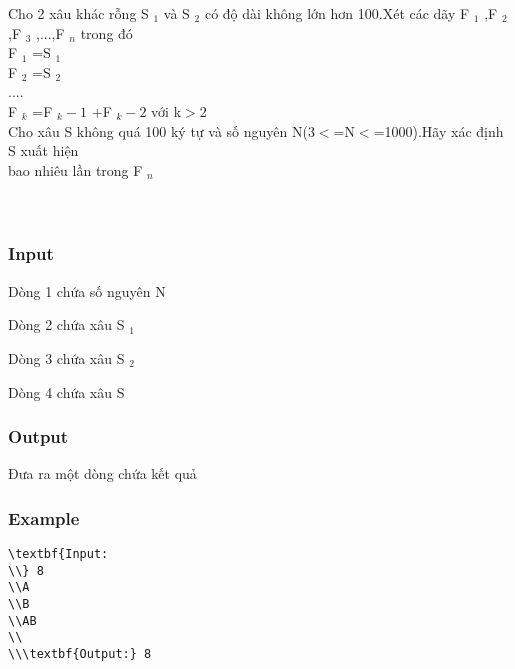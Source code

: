 



   Cho 2 xâu khác rỗng S   $_    1   $   và S   $_    2   $   có độ dài không lớn hơn 100.Xét các dãy F   $_    1   $   ,F   $_    2   $   ,F   $_    3   $   ,...,F   $_    n   $   trong đó   
\\   F   $_    1   $   =S   $_    1   $
\\   F   $_    2   $   =S   $_    2   $
\\   ....   
\\   F   $_    k   $   =F   $_    k-1   $   +F   $_    k-2   $   với k$>$2   
\\   Cho xâu S không quá 100 ký tự và số nguyên N(3$<$=N$<$=1000).Hãy xác định S xuất hiện   
\\   bao nhiêu lần trong F   $_    n   $
\\
\\
\\

\subsubsection{   Input  }

   Dòng 1 chứa số nguyên N  

   Dòng 2 chứa xâu S   $_    1   $

   Dòng 3 chứa xâu S   $_    2   $

   Dòng 4 chứa xâu S  

\subsubsection{   Output  }

   Đưa ra một dòng chứa kết quả  

\subsubsection{   Example  }
\begin{verbatim}
\textbf{Input:
\\} 8
\\A
\\B
\\AB
\\
\\\textbf{Output:} 8 \end{verbatim}